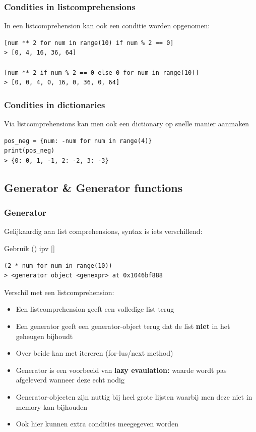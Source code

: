 \documentclass{article}
\begin{document}
\subsubsection{Condities in listcomprehensions}

In een listcomprehension kan ook een conditie worden opgenomen:

\begin{verbatim}
[num ** 2 for num in range(10) if num % 2 == 0]
> [0, 4, 16, 36, 64]

[num ** 2 if num % 2 == 0 else 0 for num in range(10)]
> [0, 0, 4, 0, 16, 0, 36, 0, 64]
\end{verbatim}

\subsubsection{Condities in dictionaries}

Via listcomprehensions kan men ook een dictionary op snelle manier aanmaken

\begin{verbatim}
pos_neg = {num: -num for num in range(4)}
print(pos_neg)
> {0: 0, 1, -1, 2: -2, 3: -3}
\end{verbatim}

\subsection{Generator \& Generator functions}

\subsubsection{Generator}

Gelijkaardig aan list comprehensions, syntax is iets verschillend:

Gebruik () ipv []

\begin{verbatim}
(2 * num for num in range(10))
> <generator object <genexpr> at 0x1046bf888
\end{verbatim}

Verschil met een listcomprehension:

\begin{itemize}
    \item Een listcomprehension geeft een volledige list terug
    \item Een generator geeft een generator-object terug dat de list \textbf{niet} in het geheugen bijhoudt
    \item Over beide kan met itereren (for-lus/next method)
    \item Generator is een voorbeeld van \textbf{lazy evaulation:} waarde wordt pas afgeleverd wanneer deze echt nodig
    \item Generator-objecten zijn nuttig bij heel grote lijsten waarbij men deze niet in memory kan bijhouden
    \item Ook hier kunnen extra condities meegegeven worden
\end{itemize}
\end{document}
